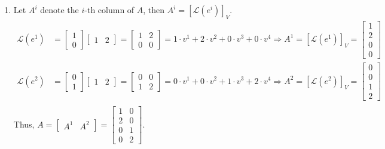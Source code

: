 \documentclass[letterpaper]{article}
\begin{document}
\begin{enumerate}
\setlength{\itemsep}{.15in}
\renewcommand{\labelenumi}{(\alph{enumi})}
\item Let $A^{i}$ denote the $i$-th column of $A$, then $A^{i}=[\mathcal{L}(e^{i})]_{V}$.
    \begin{equation*}
    \begin{split}
        \mathcal{L}(e^{1})&=\begin{bmatrix}1\\ 0\end{bmatrix}\begin{bmatrix}1& 2\end{bmatrix}=\begin{bmatrix}1& 2\\ 0 & 0\end{bmatrix}=1\cdot v^{1}+2\cdot v^{2}+0\cdot v^{3}+0\cdot v^{4} \Rightarrow A^{1}=[\mathcal{L}(e^{1})]_{V}=\begin{bmatrix}1\\ 2\\ 0 \\ 0\end{bmatrix}\\
        \mathcal{L}(e^{2})&=\begin{bmatrix}0\\ 1\end{bmatrix}\begin{bmatrix}1& 2\end{bmatrix}=\begin{bmatrix} 0 & 0 \\1& 2\end{bmatrix}=0\cdot v^{1}+0\cdot v^{2}+1\cdot v^{3}+2\cdot v^{4} \Rightarrow A^{2}=[\mathcal{L}(e^{2})]_{V}=\begin{bmatrix}0 \\ 0 \\1\\ 2 \end{bmatrix}\\
    \end{split}
    \end{equation*}
    Thus, $A=\begin{bmatrix}A^{1} & A^{2} \end{bmatrix}=\begin{bmatrix}1 & 0 \\2& 0 \\0 &1\\0& 2 \end{bmatrix}$.


\end{enumerate}
\end{document}
